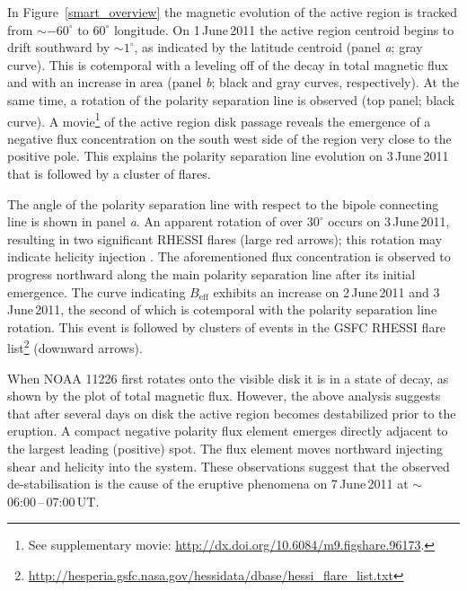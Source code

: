 In Figure~\ref{smart_overview} the magnetic evolution of the active region is tracked from $\sim$$-60^\circ$ to $60^\circ$ longitude. On 1\,June\,2011 the active region centroid begins to drift southward by $\sim$$1^\circ$, as indicated by the latitude centroid (panel \emph{a}; gray curve). This is cotemporal with a leveling off of the decay in total magnetic flux and with an increase in area (panel \emph{b}; black and gray curves, respectively). At the same time, a rotation of the polarity separation line is observed (top panel; black curve). A movie\footnote{See supplementary movie: \url{http://dx.doi.org/10.6084/m9.figshare.96173}.} of the active region disk passage reveals the emergence of a negative flux concentration on the south west side of the region very close to the positive pole. This explains the polarity separation line evolution on 3\,June\,2011 that is followed by a cluster of flares.

The angle of the polarity separation line with respect to the bipole connecting line is shown in panel \emph{a}. An apparent rotation of over $30^\circ$ occurs on 3\,June\,2011, resulting in two significant \gls{RHESSI} flares (large red arrows); this rotation may indicate helicity injection \citep{Morita:2005}. The aforementioned flux concentration is observed to progress northward along the main polarity separation line after its initial emergence. The curve indicating $B_{\mathrm{eff}}$ exhibits an increase on 2\,June\,2011 and 3\,June\,2011, the second of which is cotemporal with the polarity separation line rotation. This event is followed by clusters of events in the \gls{GSFC} \gls{RHESSI} flare list\footnote{\url{http://hesperia.gsfc.nasa.gov/hessidata/dbase/hessi\_flare\_list.txt}} (downward arrows).


When NOAA 11226 first rotates onto the visible disk it is in a state of decay, as shown by the plot of total magnetic flux. However, the above analysis suggests that after several days on disk the active region becomes destabilized prior to the eruption. A compact negative polarity flux element emerges directly adjacent to the largest leading (positive) spot. The flux element moves northward injecting shear and helicity into the system. These observations suggest that the observed de-stabilisation is the cause of the eruptive phenomena on 7\,June\,2011 at $\sim$06:00\,--\,07:00\,UT.


